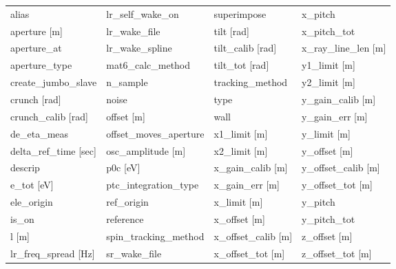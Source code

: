  \begin{tabular}{llll} \toprule
alias                          & lr_self_wake_on                & superimpose                    & x_pitch                        \\
aperture [m]                   & lr_wake_file                   & tilt [rad]                     & x_pitch_tot                    \\
aperture_at                    & lr_wake_spline                 & tilt_calib [rad]               & x_ray_line_len [m]             \\
aperture_type                  & mat6_calc_method               & tilt_tot [rad]                 & y1_limit [m]                   \\
create_jumbo_slave             & n_sample                       & tracking_method                & y2_limit [m]                   \\
crunch [rad]                   & noise                          & type                           & y_gain_calib [m]               \\
crunch_calib [rad]             & offset [m]                     & wall                           & y_gain_err [m]                 \\
de_eta_meas                    & offset_moves_aperture          & x1_limit [m]                   & y_limit [m]                    \\
delta_ref_time [sec]           & osc_amplitude [m]              & x2_limit [m]                   & y_offset [m]                   \\
descrip                        & p0c [eV]                       & x_gain_calib [m]               & y_offset_calib [m]             \\
e_tot [eV]                     & ptc_integration_type           & x_gain_err [m]                 & y_offset_tot [m]               \\
ele_origin                     & ref_origin                     & x_limit [m]                    & y_pitch                        \\
is_on                          & reference                      & x_offset [m]                   & y_pitch_tot                    \\
l [m]                          & spin_tracking_method           & x_offset_calib [m]             & z_offset [m]                   \\
lr_freq_spread [Hz]            & sr_wake_file                   & x_offset_tot [m]               & z_offset_tot [m]               \\
 \bottomrule
 \end{tabular}
 \vfill
 
